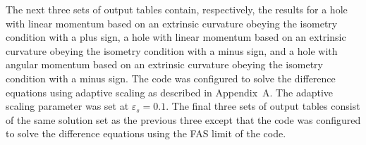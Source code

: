 The next three sets of output tables contain, respectively, the results for a
hole with linear momentum based on an extrinsic curvature obeying the isometry
condition with a plus sign, a hole with linear momentum based on an extrinsic
curvature obeying the isometry condition with a minus sign, and a hole with
angular momentum based on an extrinsic curvature obeying the isometry condition
with a minus sign.  The code was configured to solve the difference equations
using adaptive scaling as described in Appendix~A. The adaptive scaling
parameter was set at $\varepsilon_s = 0.1$.  The final three sets of output
tables consist of the same solution set as the previous three except that the
code was configured to solve the difference equations using the FAS limit of the
code.
\bigskip
\bigskip
\goodbreak
{}

\goodbreak
{}
\nobreak{}\nobreak

\goodbreak
{}\nobreak

\goodbreak
{}\nobreak

\goodbreak
{}
\nobreak{}\nobreak

\goodbreak
{}\nobreak

\goodbreak
{}\nobreak

\vfill
\eject
